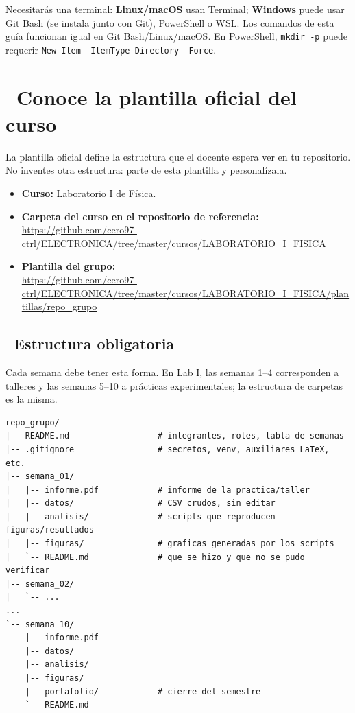 \documentclass[11pt,a4paper]{article}
\newcommand{\iconotexto}[2]{\textcolor{cyanNeon}{\faIcon{#1}}~#2}
\begin{document}
\begin{cajaRecuerda}
Necesitarás una terminal: \textbf{Linux/macOS} usan Terminal; \textbf{Windows} puede usar Git Bash (se instala junto con Git), PowerShell o WSL. Los comandos de esta guía funcionan igual en Git Bash/Linux/macOS. En PowerShell, \texttt{mkdir -p} puede requerir \texttt{New-Item -ItemType Directory -Force}.
\end{cajaRecuerda}

\section{\iconotexto{sitemap}{Conoce la plantilla oficial del curso}}

La plantilla oficial define la estructura que el docente espera ver en tu repositorio. No inventes otra estructura: parte de esta plantilla y personalízala.

\begin{tcolorbox}[tarjetaDato,title={\faIcon{github}~Ubicación de la plantilla}]
\begin{itemize}[leftmargin=1.4em,itemsep=4pt,topsep=2pt]
  \item \textbf{Curso:} Laboratorio I de Física.
  \item \textbf{Carpeta del curso en el repositorio de referencia:}\\
  \url{https://github.com/cero97-ctrl/ELECTRONICA/tree/master/cursos/LABORATORIO_I_FISICA}
  \item \textbf{Plantilla del grupo:}\\
  \url{https://github.com/cero97-ctrl/ELECTRONICA/tree/master/cursos/LABORATORIO_I_FISICA/plantillas/repo_grupo}
\end{itemize}
\end{tcolorbox}

\subsection{\iconotexto{folder-open}{Estructura obligatoria}}

Cada semana debe tener esta forma. En Lab I, las semanas 1--4 corresponden a talleres y las semanas 5--10 a prácticas experimentales; la estructura de carpetas es la misma.

\begin{lstlisting}
repo_grupo/
|-- README.md                  # integrantes, roles, tabla de semanas
|-- .gitignore                 # secretos, venv, auxiliares LaTeX, etc.
|-- semana_01/
|   |-- informe.pdf            # informe de la practica/taller
|   |-- datos/                 # CSV crudos, sin editar
|   |-- analisis/              # scripts que reproducen figuras/resultados
|   |-- figuras/               # graficas generadas por los scripts
|   `-- README.md              # que se hizo y que no se pudo verificar
|-- semana_02/
|   `-- ...
...
`-- semana_10/
    |-- informe.pdf
    |-- datos/
    |-- analisis/
    |-- figuras/
    |-- portafolio/            # cierre del semestre
    `-- README.md
\end{lstlisting}
\end{document}
